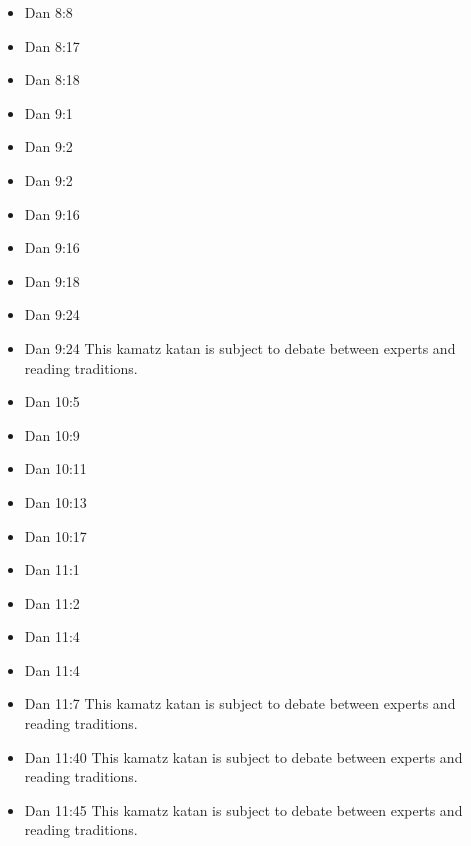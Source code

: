 \documentclass[14pt]{book}
\begin{document}
\begin{multicols}{2}
\begin{itemize}
\item Dan 8:8

\item Dan 8:17

\item Dan 8:18

\item Dan 9:1

\item Dan 9:2

\item Dan 9:2

\item Dan 9:16

\item Dan 9:16

\item Dan 9:18

\item Dan 9:24

\item Dan 9:24 This kamatz katan is subject to debate between experts and reading traditions.

\item Dan 10:5

\item Dan 10:9

\item Dan 10:11

\item Dan 10:13

\item Dan 10:17

\item Dan 11:1

\item Dan 11:2

\item Dan 11:4

\item Dan 11:4

\item Dan 11:7 This kamatz katan is subject to debate between experts and reading traditions.

\item Dan 11:40 This kamatz katan is subject to debate between experts and reading traditions.

\item Dan 11:45 This kamatz katan is subject to debate between experts and reading traditions.
\end{itemize}\end{multicols}
\end{document}
